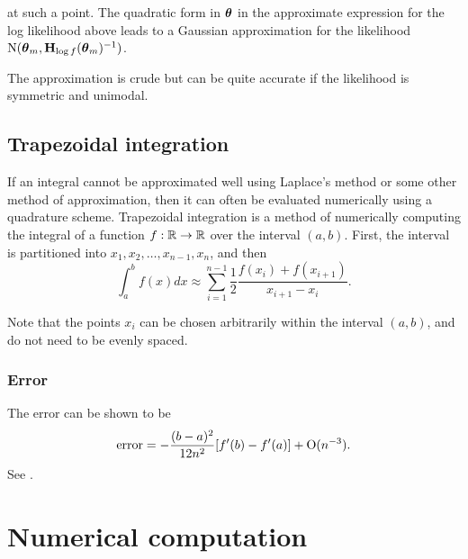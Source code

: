 \documentclass{amsart}[12pt]
\begin{document}
at such a point. The quadratic form in ${\boldsymbol \theta}$ in the approximate expression for the log likelihood above
leads to a Gaussian approximation for the likelihood $\text{N}({\boldsymbol \theta}_m, {\bf H}_{\log f}({\boldsymbol \theta}_m)^{-1})$.

The approximation is crude but can be quite accurate if the likelihood is symmetric and unimodal.

\subsection{Trapezoidal integration}

If an integral cannot be approximated well using Laplace's method or some other method of approximation, then
it can often be evaluated numerically using a quadrature scheme. Trapezoidal integration is a method of
numerically computing the integral of a function $f: {\mathbb{R}} \to {\mathbb{R}}$ over the interval $(a, b)$. First, the
interval is partitioned into $x_1, x_2, \ldots, x_{n-1}, x_n$, and then
\[
	\int_a^b f(x) dx \approx \sum_{i=1}^{n-1} \frac{1}{2} \frac{f(x_i) + f(x_{i+1})}{x_{i+1} - x_i}.
\]

Note that the points $x_i$ can be chosen arbitrarily within the interval $(a, b)$, and do not need to be
evenly spaced.

\subsubsection{Error}
The error can be shown to be
\[
	\text{error} = -\frac{(b - a)^2}{12 n^2}[f'(b) - f'(a)] + \text{O}{(n^{-3})}.
\]
See \cite{Cruz-Uribe2002}.

\section{Numerical computation}




\end{document}
